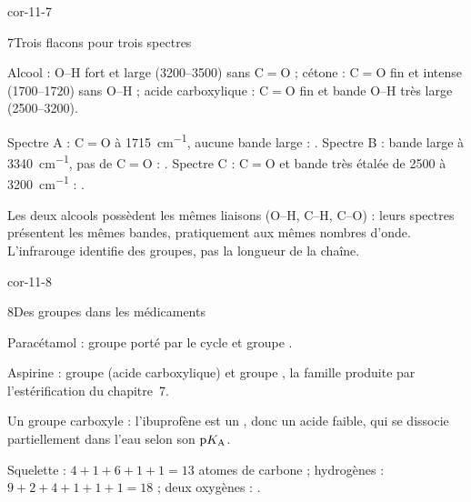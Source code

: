 \begin{blocLivre}{cor-11-7}
\begin{corrige}{7}{Trois flacons pour trois spectres}
\begin{questions}
\item Alcool : O--H fort et large (3200--3500) sans C$=$O ; cétone : C$=$O fin et intense (1700--1720) sans O--H ;
acide carboxylique : C$=$O fin et bande O--H très large (2500--3200).
\item Spectre A : C$=$O à \qty{1715}{cm^{-1}}, aucune bande large : . Spectre B : bande large à
\qty{3340}{cm^{-1}}, pas de C$=$O : . Spectre C : C$=$O et bande très étalée de 2500 à
\qty{3200}{cm^{-1}} : .
\item Les deux alcools possèdent les mêmes liaisons (O--H, C--H, C--O) : leurs spectres présentent les mêmes bandes,
pratiquement aux mêmes nombres d'onde. L'infrarouge identifie des groupes, pas la longueur de la chaîne.
\end{questions}
\end{corrige}
\end{blocLivre}
\begin{blocLivre}{cor-11-8}
\begin{corrige}{8}{Des groupes dans les médicaments}
\begin{questions}
\item Paracétamol : groupe   porté par le cycle et groupe 
.
\item Aspirine : groupe   (acide carboxylique) et groupe 
, la famille produite par l'estérification du chapitre~7.
\item Un groupe carboxyle : l'ibuprofène est un , donc un acide faible, qui se
dissocie partiellement dans l'eau selon son $\mathrm{p}K_{\mathrm{A}}$.
\item Squelette : $4+1+6+1+1=13$ atomes de carbone ; hydrogènes : $9+2+4+1+1+1=18$ ; deux oxygènes :
.
\end{questions}
\end{corrige}
\end{blocLivre}
